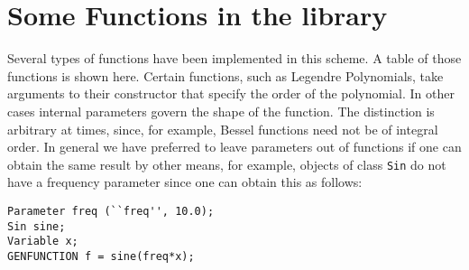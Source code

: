 \documentclass{report}
\begin{document}
\section{Some Functions in the library}

\noindent Several types of functions have been implemented in this scheme.  A
table of those functions is shown here.  Certain functions, such as
Legendre Polynomials, take arguments to their constructor that specify
the order of the polynomial.  In other cases internal parameters 
govern the shape of the function.  The distinction is arbitrary at times, 
since, for example, Bessel functions need not be of integral order.
In general we have preferred to leave parameters out of functions if
one can obtain the same result by other means, for example, objects
of class \verb#Sin# do not have a frequency parameter since one
can obtain this as follows:
\begin{verbatim}
Parameter freq (``freq'', 10.0);	
Sin sine;
Variable x;	
GENFUNCTION f = sine(freq*x);	
\end{verbatim}
\end{document}
